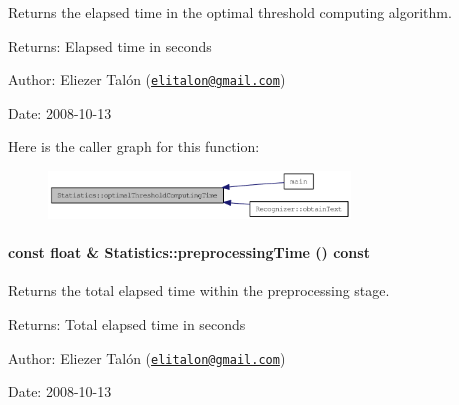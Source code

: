 Returns the elapsed time in the optimal threshold computing algorithm. 

\begin{Desc}
\item[Returns:]Elapsed time in seconds\end{Desc}
\begin{Desc}
\item[Author:]Eliezer Talón (\href{mailto:elitalon@gmail.com}{\tt elitalon@gmail.com}) \end{Desc}
\begin{Desc}
\item[Date:]2008-10-13 \end{Desc}


Here is the caller graph for this function:\nopagebreak
\begin{figure}[H]
\begin{center}
\leavevmode
\includegraphics[width=227pt]{class_statistics_3a364709b9fe8dbefd03b3bb45d9a89d_icgraph}
\end{center}
\end{figure}
\hypertarget{class_statistics_96aafebb86be480130007bd437875156}{
\paragraph[{preprocessingTime}]{\setlength{\rightskip}{0pt plus 5cm}const float \& Statistics::preprocessingTime () const}\hfill}
\label{class_statistics_96aafebb86be480130007bd437875156}


Returns the total elapsed time within the preprocessing stage. 

\begin{Desc}
\item[Returns:]Total elapsed time in seconds\end{Desc}
\begin{Desc}
\item[Author:]Eliezer Talón (\href{mailto:elitalon@gmail.com}{\tt elitalon@gmail.com}) \end{Desc}
\begin{Desc}
\item[Date:]2008-10-13 \end{Desc}


